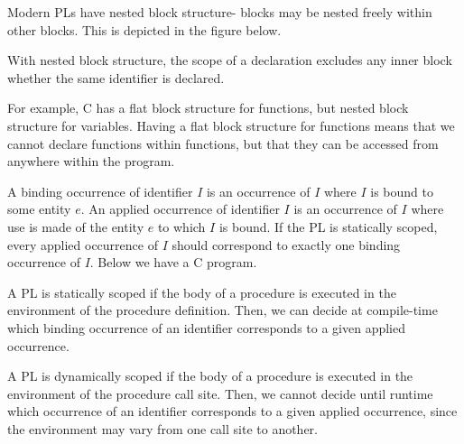 \documentclass[a4paper, openany]{memoir}
\begin{document}
Modern PLs have nested block structure- blocks may be nested freely within other blocks. This is depicted in the figure below.
\begin{figure}[H]
    \centering
\end{figure}
\noindent With nested block structure, the scope of a declaration excludes any inner block whether the same identifier is declared.

For example, C has a flat block structure for functions, but nested block structure for variables. Having a flat block structure for functions means that we cannot declare functions within functions, but that they can be accessed from anywhere within the program.

A binding occurrence of identifier $I$ is an occurrence of $I$ where $I$ is bound to some entity $e$. An applied occurrence of identifier $I$ is an occurrence of $I$ where use is made of the entity $e$ to which $I$ is bound. If the PL is statically scoped, every applied occurrence of $I$ should correspond to exactly one binding occurrence of $I$. Below we have a C program.

A PL is statically scoped if the body of a procedure is executed in the environment of the procedure definition. Then, we can decide at compile-time which binding occurrence of an identifier corresponds to a given applied occurrence. 

A PL is dynamically scoped if the body of a procedure is executed in the environment of the procedure call site. Then, we cannot decide until runtime which occurrence of an identifier corresponds to a given applied occurrence, since the environment may vary from one call site to another.
\end{document}
